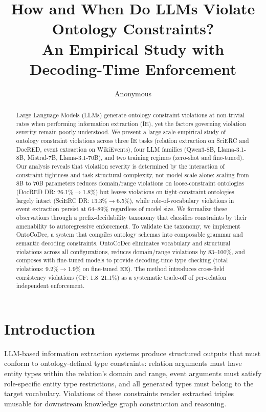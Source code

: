 \documentclass[11pt,a4paper]{article}
\title{How and When Do LLMs Violate Ontology Constraints? \\ An Empirical Study with Decoding-Time Enforcement}
\author{Anonymous}
\date{}
\begin{document}
\maketitle

\begin{abstract}
Large Language Models (LLMs) generate ontology constraint violations at non-trivial rates when performing information extraction (IE), yet the factors governing violation severity remain poorly understood.
We present a large-scale empirical study of ontology constraint violations across three IE tasks (relation extraction on SciERC and DocRED, event extraction on WikiEvents), four LLM families (Qwen3-8B, Llama-3.1-8B, Mistral-7B, Llama-3.1-70B), and two training regimes (zero-shot and fine-tuned).
Our analysis reveals that violation severity is determined by the interaction of constraint tightness and task structural complexity, not model scale alone: scaling from 8B to 70B parameters reduces domain/range violations on loose-constraint ontologies (DocRED DR: 26.1\%$\to$1.8\%) but leaves violations on tight-constraint ontologies largely intact (SciERC DR: 13.3\%$\to$6.5\%), while role-of-vocabulary violations in event extraction persist at 64--89\% regardless of model size.
We formalize these observations through a prefix-decidability taxonomy that classifies constraints by their amenability to autoregressive enforcement.
To validate the taxonomy, we implement OntoCoDec, a system that compiles ontology schemas into composable grammar and semantic decoding constraints.
OntoCoDec eliminates vocabulary and structural violations across all configurations, reduces domain/range violations by 83--100\%, and composes with fine-tuned models to provide decoding-time type checking (total violations: 9.2\%$\to$1.9\% on fine-tuned EE).
The method introduces cross-field consistency violations (CF: 1.8--21.1\%) as a systematic trade-off of per-relation independent enforcement.
\end{abstract}

\section{Introduction}

LLM-based information extraction systems produce structured outputs that must conform to ontology-defined type constraints: relation arguments must have entity types within the relation's domain and range, event arguments must satisfy role-specific entity type restrictions, and all generated types must belong to the target vocabulary. Violations of these constraints render extracted triples unusable for downstream knowledge graph construction and reasoning.
\end{document}
